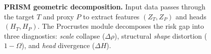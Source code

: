 \begin{figure}[htbp]
{
}
\caption{\textbf{PRISM geometric decomposition.}
Input data passes through the target $T$ and proxy $P$ to extract features $(Z_T, Z_P)$ and heads $(H_T, H_P)$.
The Procrustes module decomposes the risk gap into three diagnostics:
\emph{scale} collapse ($\Delta\rho$), structural \emph{shape} distortion ($1{-}\Omega$), and \emph{head} divergence ($\Delta H$).}
\label{fig:prism_concept}
\end{figure}
